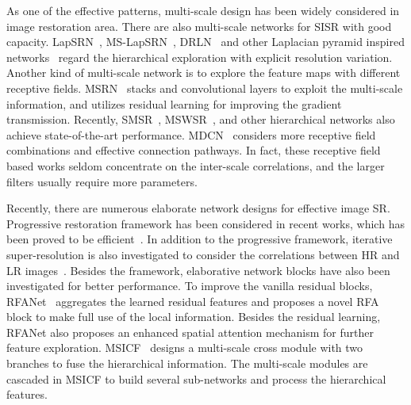 \documentclass[manuscript,screen]{acmart}
\begin{document}
As one of the effective patterns, multi-scale design has been widely considered in image restoration area. There are also multi-scale networks for SISR with good capacity. LapSRN~\cite{lapsrn_cvpr2017}, MS-LapSRN~\cite{lapsrn_pami2019}, DRLN~\cite{drln_pami2020} and other Laplacian pyramid inspired networks~\cite{laplacian_tnnls2020} regard the hierarchical exploration with explicit resolution variation. Another kind of multi-scale network is to explore the feature maps with different receptive fields. MSRN~\cite{msrn_eccv2018} stacks  and  convolutional layers to exploit the multi-scale information, and utilizes residual learning for improving the gradient transmission. Recently, SMSR~\cite{smsr_tgrs2020}, MSWSR~\cite{mswsr_jstsp2020}, and other hierarchical networks also achieve state-of-the-art performance. MDCN~\cite{mdcn_csvt2020} considers more receptive field combinations and effective connection pathways. In fact, these receptive field based works seldom concentrate on the inter-scale correlations, and the larger filters usually require more parameters.

Recently, there are numerous elaborate network designs for effective image SR. Progressive restoration framework has been considered in recent works, which has been proved to be efficient~\cite{survey_pami2021}. In addition to the progressive framework, iterative super-resolution is also investigated to consider the correlations between HR and LR images~\cite{survey_pami2021}. Besides the framework, elaborative network blocks have also been investigated for better performance. To improve the vanilla residual blocks, RFANet~\cite{rfanet_cvpr2020} aggregates the learned residual features and proposes a novel RFA block to make full use of the local information. Besides the residual learning, RFANet also proposes an enhanced spatial attention mechanism for further feature exploration. MSICF~\cite{msicf_sp2021} designs a multi-scale cross module with two branches to fuse the hierarchical information. The multi-scale modules are cascaded in MSICF to build several sub-networks and process the hierarchical features.
\end{document}
